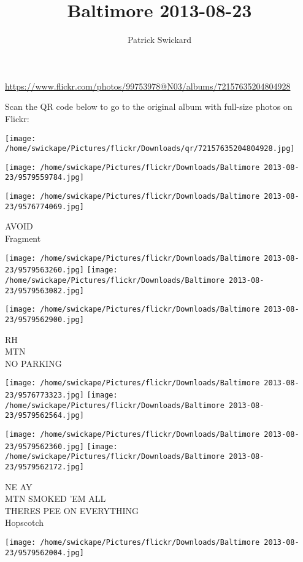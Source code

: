 \documentclass[10pt,letterpaper]{article}
\title{Baltimore 2013-08-23}
\author{Patrick Swickard}
\date{}
\begin{document}
\maketitle

\url{https://www.flickr.com/photos/99753978@N03/albums/72157635204804928}

Scan the QR code below to go to the original album with full-size photos on Flickr:

\texttt{[image: /home/swickape/Pictures/flickr/Downloads/qr/72157635204804928.jpg]}
\pagebreak

\texttt{[image: /home/swickape/Pictures/flickr/Downloads/Baltimore 2013-08-23/9579559784.jpg]}

\vspace{0.25in}
\texttt{[image: /home/swickape/Pictures/flickr/Downloads/Baltimore 2013-08-23/9576774069.jpg]}

AVOID\\
Fragment
\pagebreak

\texttt{[image: /home/swickape/Pictures/flickr/Downloads/Baltimore 2013-08-23/9579563260.jpg]}
\texttt{[image: /home/swickape/Pictures/flickr/Downloads/Baltimore 2013-08-23/9579563082.jpg]}

\vspace{0.25in}
\texttt{[image: /home/swickape/Pictures/flickr/Downloads/Baltimore 2013-08-23/9579562900.jpg]}

RH\\
MTN\\
NO PARKING
\pagebreak

\texttt{[image: /home/swickape/Pictures/flickr/Downloads/Baltimore 2013-08-23/9576773323.jpg]}
\texttt{[image: /home/swickape/Pictures/flickr/Downloads/Baltimore 2013-08-23/9579562564.jpg]}

\texttt{[image: /home/swickape/Pictures/flickr/Downloads/Baltimore 2013-08-23/9579562360.jpg]}
\texttt{[image: /home/swickape/Pictures/flickr/Downloads/Baltimore 2013-08-23/9579562172.jpg]}

NE AY\\
MTN SMOKED 'EM ALL\\
THERES PEE ON EVERYTHING\\
Hopscotch
\pagebreak

\texttt{[image: /home/swickape/Pictures/flickr/Downloads/Baltimore 2013-08-23/9579562004.jpg]}
\end{document}

